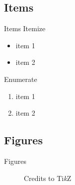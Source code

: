 \documentclass[compress, aspectratio=169]{beamer}
\begin{document}
\subsection{Items}

\begin{frame}{Items}
  Itemize
  \begin{itemize}
    \item item 1
    \item item 2
  \end{itemize}

  \bigskip

  Enumerate
  \begin{enumerate}
    \item item 1
    \item item 2
  \end{enumerate}
\end{frame}

\subsection{Figures}

\begin{frame}{Figures}
  \begin{figure}
    \centering
    \caption{Credits to Ti\textit{k}Z}
  \end{figure}
\end{frame}
\end{document}

